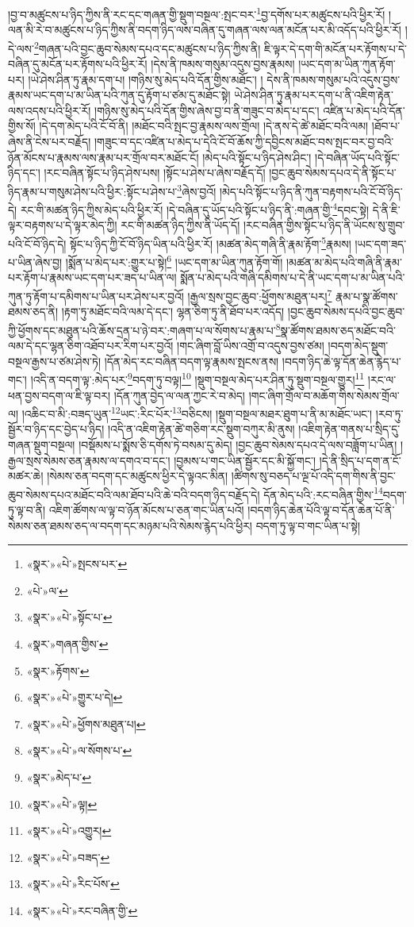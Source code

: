 །བྱ་བ་མཚུངས་པ་ཉིད་ཀྱིས་ནི་རང་དང་གཞན་གྱི་སྡུག་བསྔལ་:སྤང་བར་\footnote{«སྣར་»«པེ་»སྤངས་པར་}བྱ་དགོས་པར་མཚུངས་པའི་ཕྱིར་རོ། །ལན་མི་རེ་བ་མཚུངས་པ་ཉིད་ཀྱིས་ནི་བདག་ཉིད་ལས་བཞིན་དུ་གཞན་ལས་ལན་མངོན་པར་མི་འདོད་པའི་ཕྱིར་རོ། །དེ་ལས་\footnote{«པེ་»ལ་}གཞན་པའི་བྱང་ཆུབ་སེམས་དཔའ་དང་མཚུངས་པ་ཉིད་ཀྱིས་ནི། ཇི་ལྟར་དེ་དག་གི་མངོན་པར་རྟོགས་པ་དེ་བཞིན་དུ་མངོན་པར་རྟོགས་པའི་ཕྱིར་རོ། །དེས་ནི་ཁམས་གསུམ་འདུས་བྱས་རྣམས། །ཡང་དག་མ་ཡིན་ཀུན་རྟོག་པར། །ཡེ་ཤེས་ཤིན་ཏུ་རྣམ་དག་པ། །གཉིས་སུ་མེད་པའི་དོན་གྱིས་མཐོང་། །
དེས་ནི་ཁམས་གསུམ་པའི་འདུས་བྱས་རྣམས་ཡང་དག་པ་མ་ཡིན་པའི་ཀུན་དུ་རྟོག་པ་ཙམ་དུ་མཐོང་སྟེ། ཡེ་ཤེས་ཤིན་ཏུ་རྣམ་པར་དག་པ་ནི་འཇིག་རྟེན་ལས་འདས་པའི་ཕྱིར་རོ། །གཉིས་སུ་མེད་པའི་དོན་གྱིས་ཞེས་བྱ་བ་ནི་གཟུང་བ་མེད་པ་དང་། འཛིན་པ་མེད་པའི་དོན་གྱིས་སོ། །དེ་དག་མེད་པའི་ངོ་བོ་ནི། །མཐོང་བའི་སྤང་བྱ་རྣམས་ལས་གྲོལ། །དེ་ནས་དེ་ཚེ་མཐོང་བའི་ལམ། །ཐོབ་པ་ཞེས་ནི་ངེས་པར་བརྗོད། །གཟུང་བ་དང་འཛིན་པ་མེད་པ་དེའི་ངོ་བོ་ཆོས་ཀྱི་དབྱིངས་མཐོང་བས་སྤང་བར་བྱ་བའི་ཉོན་མོངས་པ་རྣམས་ལས་རྣམ་པར་གྲོལ་བར་མཐོང་ངོ། །མེད་པའི་སྟོང་པ་ཉིད་ཤེས་ཤིང་། །དེ་བཞིན་ཡོད་པའི་སྟོང་ཉིད་དང་། །རང་བཞིན་སྟོང་པ་ཉིད་ཤེས་པས། །སྟོང་པ་ཤེས་པ་ཞེས་བརྗོད་དོ། །བྱང་ཆུབ་སེམས་དཔའ་དེ་ནི་སྟོང་པ་ཉིད་རྣམ་པ་གསུམ་ཤེས་པའི་ཕྱིར་:སྟོང་པ་ཤེས་པ་\footnote{«སྣར་»«པེ་»སྟོང་པ་}ཞེས་བྱའོ། །མེད་པའི་སྟོང་པ་ཉིད་ནི་ཀུན་བརྟགས་པའི་ངོ་བོ་ཉིད་དེ། རང་གི་མཚན་ཉིད་ཀྱིས་མེད་པའི་ཕྱིར་རོ། །དེ་བཞིན་དུ་ཡོད་པའི་སྟོང་པ་ཉིད་ནི་:གཞན་གྱི་\footnote{«སྣར་»གཞན་གྱིས་}དབང་སྟེ། དེ་ནི་ཇི་ལྟར་བརྟགས་པ་དེ་ལྟར་མེད་ཀྱི། རང་གི་མཚན་ཉིད་ཀྱིས་ནི་ཡོད་དོ། །རང་བཞིན་གྱིས་སྟོང་པ་ཉིད་ནི་ཡོངས་སུ་གྲུབ་པའི་ངོ་བོ་ཉིད་དེ། སྟོང་པ་ཉིད་ཀྱི་ངོ་བོ་ཉིད་ཡིན་པའི་ཕྱིར་རོ། །མཚན་མེད་གཞི་ནི་རྣམ་རྟོག་\footnote{«སྣར་»རྟོགས་}རྣམས། །ཡང་དག་ཟད་པ་ཡིན་ཞེས་བྱ། །སྨོན་པ་མེད་པར་:གྱུར་པ་སྟེ།\footnote{«སྣར་»«པེ་»གྱུར་པ་དེ།} །ཡང་དག་མ་ཡིན་ཀུན་རྟོག་གོ། །མཚན་མ་མེད་པའི་གཞི་ནི་རྣམ་པར་རྟོག་པ་རྣམས་ཡང་དག་པར་ཟད་པ་ཡིན་ལ། སྨོན་པ་མེད་པའི་གཞི་དམིགས་པ་དེ་ནི་ཡང་དག་པ་མ་ཡིན་པའི་ཀུན་ཏུ་རྟོག་པ་དམིགས་པ་ཡིན་པར་ཤེས་པར་བྱའོ། །རྒྱལ་སྲས་བྱང་ཆུབ་:ཕྱོགས་མཐུན་པར།\footnote{«སྣར་»«པེ་»ཕྱོགས་མཐུན་པ།} རྣམ་པ་སྣ་ཚོགས་ཐམས་ཅད་ནི། །རྟག་ཏུ་མཐོང་བའི་ལམ་དེ་དང་། ལྷན་ཅིག་ཏུ་ནི་ཐོབ་པར་འདོད། །བྱང་ཆུབ་སེམས་དཔའི་བྱང་ཆུབ་ཀྱི་ཕྱོགས་དང་མཐུན་པའི་ཆོས་དྲན་པ་ཉེ་བར་:གཞག་པ་ལ་སོགས་པ་རྣམ་པ་\footnote{«སྣར་»«པེ་»ལ་སོགས་པ་}སྣ་ཚོགས་ཐམས་ཅད་མཐོང་བའི་ལམ་དེ་དང་ལྷན་ཅིག་འཐོབ་པར་རིག་པར་བྱའོ། །གང་ཞིག་བློ་ཡིས་འགྲོ་བ་འདུས་བྱས་ཙམ། །བདག་མེད་སྡུག་བསྔལ་རྒྱས་པ་ཙམ་ཤེས་ཏེ། །དོན་མེད་རང་བཞིན་བདག་ལྟ་རྣམས་སྤངས་ནས། །བདག་ཉིད་ཆེ་ལྟ་དོན་ཆེན་རྙེད་པ་གང་། །འདི་ན་བདག་ལྟ་:མེད་པར་\footnote{«སྣར་»མེད་པ་}བདག་ཏུ་བལྟ།\footnote{«སྣར་»«པེ་»ལྟ།} །སྡུག་བསྔལ་མེད་པར་ཤིན་ཏུ་སྡུག་བསྔལ་གྱུར།\footnote{«སྣར་»«པེ་»འགྱུར།} །རང་ལ་ཕན་བྱས་བདག་ལ་ཇི་ལྟ་བར། །དོན་ཀུན་བྱེད་ལ་ལན་ཀྱང་རེ་བ་མེད། །གང་ཞིག་གྲོལ་བ་མཆོག་གིས་སེམས་གྲོལ་ལ། །འཆིང་བ་མི་:བཟད་ཡུན་\footnote{«སྣར་»«པེ་»བཟད་}ཡང་:རིང་པོར་\footnote{«སྣར་»«པེ་»རིང་པོས་}བཅིངས། །སྡུག་བསྔལ་མཐར་ཐུག་པ་ནི་མ་མཐོང་ཡང་། །རབ་ཏུ་སྦྱོར་བ་ཉིད་དང་བྱེད་པ་ཉིད། །འདི་ན་འཇིག་རྟེན་ཚེ་གཅིག་རང་སྡུག་བཀུར་མི་ནུས། །འཇིག་རྟེན་གནས་པ་སྲིད་དུ་གཞན་སྡུག་བསྔལ། །བསྡོམས་པ་སྨོས་ཅི་དགོས་ཏེ་བསམ་དུ་མེད། །བྱང་ཆུབ་སེམས་དཔའ་དེ་ལས་བཟློག་པ་ཡིན། །རྒྱལ་སྲས་སེམས་ཅན་རྣམས་ལ་དགའ་བ་དང་། །བྱམས་པ་གང་ཡིན་སྦྱོར་དང་མི་སྐྱོ་གང་། །དེ་ནི་སྲིད་པ་དག་ན་ངོ་མཚར་ཆེ། །སེམས་ཅན་བདག་དང་མཚུངས་ཕྱིར་དེ་ལྟའང་མིན། །ཚིགས་སུ་བཅད་པ་ལྔ་པོ་འདི་དག་གིས་ནི་བྱང་ཆུབ་སེམས་དཔའ་མཐོང་བའི་ལམ་ཐོབ་པའི་ཆེ་བའི་བདག་ཉིད་བརྗོད་དེ། དོན་མེད་པའི་:རང་བཞིན་གྱིས་\footnote{«སྣར་»«པེ་»རང་བཞིན་གྱི་}བདག་ཏུ་ལྟ་བ་ནི། འཇིག་ཚོགས་ལ་ལྟ་བ་ཉོན་མོངས་པ་ཅན་གང་ཡིན་པའོ། །བདག་ཉིད་ཆེན་པོའི་ལྟ་བ་དོན་ཆེན་པོ་ནི་སེམས་ཅན་ཐམས་ཅད་ལ་བདག་དང་མཉམ་པའི་སེམས་རྙེད་པའི་ཕྱིར། བདག་ཏུ་ལྟ་བ་གང་ཡིན་པ་སྟེ། 